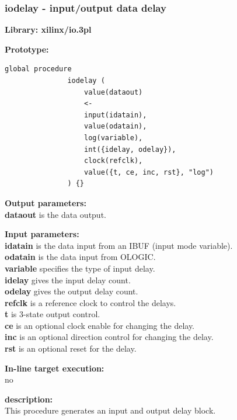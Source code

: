         \subsubsection{iodelay - input/output data delay}\label{sec:lpiodelay}

            {\bf Library: xilinx/io.3pl}

            {\bf Prototype:} \\
            \vsp
            \begin{lstlisting}[gobble=12, language=threepl]
               global procedure
               iodelay (
                   value(dataout)
                   <-
                   input(idatain),
                   value(odatain),
                   log(variable),
                   int({idelay, odelay}),
                   clock(refclk),
                   value({t, ce, inc, rst}, "log")
               ) {}
            \end{lstlisting}

            {\bf Output parameters:} \\
            {\bf dataout} is the data output.

            {\bf Input parameters:} \\            
            {\bf idatain} is the data input from an IBUF (input mode variable).\\
            {\bf odatain} is the data input from OLOGIC.\\
            {\bf variable} specifies the type of input delay.\\
            {\bf idelay} gives the input delay count.\\
            {\bf odelay} gives the output delay count.\\
            {\bf refclk} is a reference clock to control the delays.\\
            {\bf t} is 3-state output control.\\
            {\bf ce} is an optional clock enable for changing the delay.\\
            {\bf inc} is an optional direction control for changing the delay.\\
            {\bf rst} is an optional reset for the delay.
        
            {\bf In-line target execution:} \\
            no

            {\bf description:} \\
            This procedure generates an input and output delay block.
            
